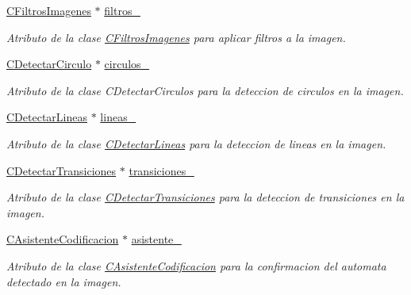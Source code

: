 \begin{DoxyCompactItemize}
\item 
\hyperlink{classCFiltrosImagenes}{C\+Filtros\+Imagenes} $\ast$ \hyperlink{classCOperacionesImagen_aa27657bee56e9afe2a64937e15c15d46}{filtros\+\_\+}
\begin{DoxyCompactList}\small\item\em Atributo de la clase \hyperlink{classCFiltrosImagenes}{C\+Filtros\+Imagenes} para aplicar filtros a la imagen. \end{DoxyCompactList}\item 
\hyperlink{classCDetectarCirculo}{C\+Detectar\+Circulo} $\ast$ \hyperlink{classCOperacionesImagen_a385572b456e0aeaa055392daecf325d6}{circulos\+\_\+}
\begin{DoxyCompactList}\small\item\em Atributo de la clase C\+Detectar\+Circulos para la deteccion de circulos en la imagen. \end{DoxyCompactList}\item 
\hyperlink{classCDetectarLineas}{C\+Detectar\+Lineas} $\ast$ \hyperlink{classCOperacionesImagen_a50efc40444cef260102dc2ceb6d4c608}{lineas\+\_\+}
\begin{DoxyCompactList}\small\item\em Atributo de la clase \hyperlink{classCDetectarLineas}{C\+Detectar\+Lineas} para la deteccion de lineas en la imagen. \end{DoxyCompactList}\item 
\hyperlink{classCDetectarTransiciones}{C\+Detectar\+Transiciones} $\ast$ \hyperlink{classCOperacionesImagen_a7ca38abb7714e00773895e8bcda443c1}{transiciones\+\_\+}
\begin{DoxyCompactList}\small\item\em Atributo de la clase \hyperlink{classCDetectarTransiciones}{C\+Detectar\+Transiciones} para la deteccion de transiciones en la imagen. \end{DoxyCompactList}\item 
\hyperlink{classCAsistenteCodificacion}{C\+Asistente\+Codificacion} $\ast$ \hyperlink{classCOperacionesImagen_a25e6302fe48f708fa1bd20e11334e75f}{asistente\+\_\+}
\begin{DoxyCompactList}\small\item\em Atributo de la clase \hyperlink{classCAsistenteCodificacion}{C\+Asistente\+Codificacion} para la confirmacion del automata detectado en la imagen. \end{DoxyCompactList}\end{DoxyCompactItemize}


